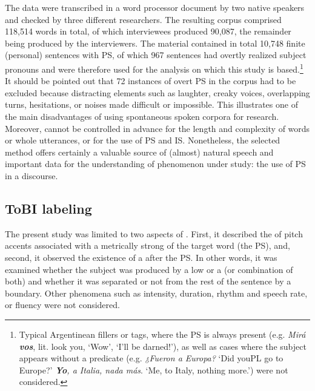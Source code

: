 \documentclass[output=paper]{langsci/langscibook}
\begin{document}
The data were transcribed in a word processor document by two native  speakers and checked by three different researchers. The resulting corpus comprised 118,514 words in total, of which interviewees produced 90,087, the remainder being produced by the interviewers. The material contained in total 10,748 finite (personal) sentences with PS, of which 967 sentences had overtly realized subject pronouns and were therefore used for the analysis on which this study is based.\footnote{Typical Argentinean fillers or tags, where the PS is always present (e.g. \textit{Mirá} \textbf{\textit{vos}}, lit. look you, ‘Wow’, ‘I’ll be darned!’), as well as cases where the subject appears without a predicate (e.g. \textit{¿Fueron a Europa?} ‘Did youPL go to Europe?’ \textbf{\textit{Yo}}\textit{, a Italia, nada más}. ‘Me, to Italy, nothing more.’) were not considered.} It should be pointed out that 72 instances of overt PS in the corpus had to be excluded because distracting elements such as laughter, creaky voices, overlapping turns, hesitations, or noises made  difficult or impossible. This illustrates one of the main disadvantages of using spontaneous spoken corpora for research. Moreover,  cannot be controlled in advance for the length and complexity of words or whole utterances, or for the use of PS and IS. Nonetheless, the selected method offers certainly a valuable source of (almost) natural speech and important data for the understanding of phenomenon under study: the use of PS in a discourse.
 
\subsection{ToBI labeling}
\label{sec:pes:3.2}
The present study was limited to two aspects of . First, it described the  of pitch accents associated with a metrically strong  of the target word (the PS), and, second, it observed the existence of a  after the PS. In other words, it was examined whether the subject was produced by a low or a  (or combination of both) and whether it was separated or not from the rest of the sentence by a  boundary. Other  phenomena such as intensity, duration, rhythm and speech rate, or fluency were not considered.
\end{document}
